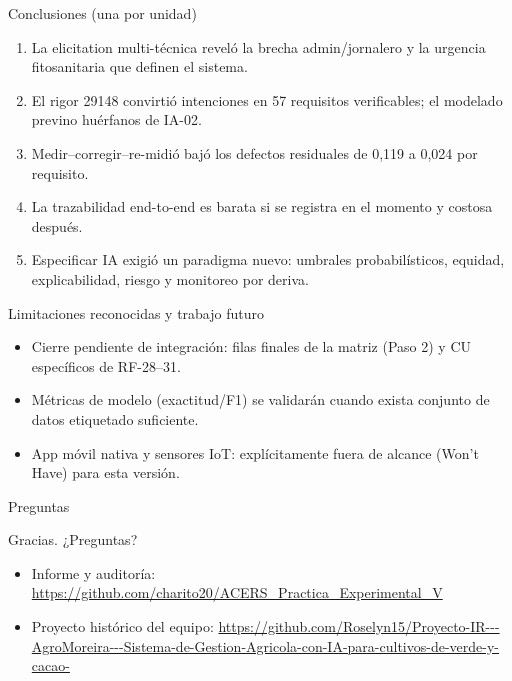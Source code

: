 \documentclass[12pt,aspectratio=169]{beamer}
\begin{document}
\begin{frame}{Conclusiones (una por unidad)}
  \small
  \begin{enumerate}
    \item La elicitation multi-t\'ecnica revel\'o la brecha admin/jornalero y la urgencia fitosanitaria que definen el sistema.
    \item El rigor 29148 convirti\'o intenciones en 57 requisitos verificables; el modelado previno hu\'erfanos de IA-02.
    \item Medir--corregir--re-midi\'o baj\'o los defectos residuales de 0,119 a 0,024 por requisito.
    \item La trazabilidad end-to-end es barata si se registra en el momento y costosa despu\'es.
    \item Especificar IA exigi\'o un paradigma nuevo: umbrales probabil\'isticos, equidad, explicabilidad, riesgo y monitoreo por deriva.
  \end{enumerate}
\end{frame}

\begin{frame}{Limitaciones reconocidas y trabajo futuro}
  \begin{itemize}
    \item Cierre pendiente de integraci\'on: filas finales de la matriz (Paso 2) y CU espec\'ificos de RF-28--31.
    \item M\'etricas de modelo (exactitud/F1) se validar\'an cuando exista conjunto de datos etiquetado suficiente.
    \item App m\'ovil nativa y sensores IoT: expl\'icitamente fuera de alcance (Won't Have) para esta versi\'on.
  \end{itemize}
\end{frame}

\begin{frame}{Preguntas}
  \begin{center}
    \Large Gracias. ¿Preguntas?
  \end{center}
  \vspace{6pt}
  \small
  \begin{itemize}
    \item Informe y auditor\'ia: \url{https://github.com/charito20/ACERS_Practica_Experimental_V}
    \item Proyecto hist\'orico del equipo: \url{https://github.com/Roselyn15/Proyecto-IR---AgroMoreira---Sistema-de-Gestion-Agricola-con-IA-para-cultivos-de-verde-y-cacao-}
  \end{itemize}
\end{frame}
\end{document}
